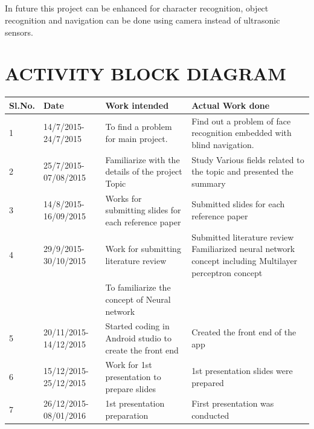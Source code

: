 \documentclass[11pt,a4paper,twoside]{report}
\begin{document}
\paragraph{ }In future this project can be enhanced for character recognition, object recognition and navigation can be done using camera instead of ultrasonic sensors.
\chapter{ACTIVITY BLOCK DIAGRAM}
\begin{small}
\begin{tabular}{|p{1cm}|p{2cm}|p{4.3cm}|p{4.3cm}|} 
\hline 
Sl.No.& Date & Work intended &  Actual Work done  \\ 
\hline 
1&  14/7/2015-24/7/2015 &  To find a problem for main project. & Find out a problem of face recognition embedded with blind navigation.
\\   								              
\hline 
2& 	25/7/2015-07/08/2015 & Familiarize with the details of the project Topic & Study Various fields related to the topic and presented the summary
\\
\hline
3 &  14/8/2015-16/09/2015 & Works for submitting slides for each reference paper  & Submitted slides for each reference paper
\\
\hline 
4 & 29/9/2015-30/10/2015  &Work for submitting literature review &   Submitted literature review
Familiarized neural network concept including Multilayer perceptron concept
\\
& &To familiarize the concept of Neural network&
\\
\hline 



\hline
5 & 20/11/2015-14/12/2015 & Started coding in Android studio to create the front end &Created the front end of the app  
\\
\hline 
6 & 15/12/2015-25/12/2015 &Work for 1st presentation to prepare slides &1st presentation slides were prepared
 \\   	
\hline 
7 & 26/12/2015-08/01/2016& 1st presentation preparation& First presentation was conducted
\\
\hline
\end{tabular} 
\end{small}
\end{document}
